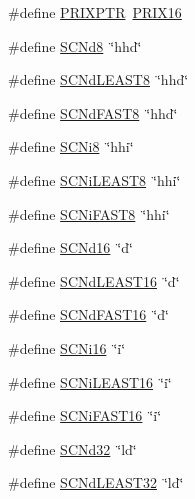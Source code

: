 \begin{DoxyCompactItemize}
\item 
\#define \hyperlink{group__avr__inttypes_ga65d9856517198cfc21558c0d6df64207}{P\+R\+I\+X\+P\+TR}~\hyperlink{group__avr__inttypes_ga570ca9af5087023f75fc8a1a602d26ab}{P\+R\+I\+X16}
\item 
\#define \hyperlink{group__avr__inttypes_gabf98c3a9ad120b11ec2911b9398e3f2f}{S\+C\+Nd8}~\char`\"{}hhd\char`\"{}
\item 
\#define \hyperlink{group__avr__inttypes_gab0af8c396d9c885950d423f8dee54164}{S\+C\+Nd\+L\+E\+A\+S\+T8}~\char`\"{}hhd\char`\"{}
\item 
\#define \hyperlink{group__avr__inttypes_ga6dc7d2f030d25e79ae8398088161b860}{S\+C\+Nd\+F\+A\+S\+T8}~\char`\"{}hhd\char`\"{}
\item 
\#define \hyperlink{group__avr__inttypes_ga535485ea35661ff75a8d2bc0d2ebe807}{S\+C\+Ni8}~\char`\"{}hhi\char`\"{}
\item 
\#define \hyperlink{group__avr__inttypes_ga1a0b88bf6f131db927f2e7f1f6abb644}{S\+C\+Ni\+L\+E\+A\+S\+T8}~\char`\"{}hhi\char`\"{}
\item 
\#define \hyperlink{group__avr__inttypes_gac864120101e01707ca52c0976b4e539a}{S\+C\+Ni\+F\+A\+S\+T8}~\char`\"{}hhi\char`\"{}
\item 
\#define \hyperlink{group__avr__inttypes_ga35974d44b5dcebcb222b8e2c1384241d}{S\+C\+Nd16}~\char`\"{}d\char`\"{}
\item 
\#define \hyperlink{group__avr__inttypes_ga10db5de9c84ccfa6dc0e487dd72051f3}{S\+C\+Nd\+L\+E\+A\+S\+T16}~\char`\"{}d\char`\"{}
\item 
\#define \hyperlink{group__avr__inttypes_ga09c9f36f654aa50a548d7820421cdc57}{S\+C\+Nd\+F\+A\+S\+T16}~\char`\"{}d\char`\"{}
\item 
\#define \hyperlink{group__avr__inttypes_ga7b8508989273ad152f9b3b7cd4db6eee}{S\+C\+Ni16}~\char`\"{}i\char`\"{}
\item 
\#define \hyperlink{group__avr__inttypes_ga14ec2649667b53ff91a1103c02975837}{S\+C\+Ni\+L\+E\+A\+S\+T16}~\char`\"{}i\char`\"{}
\item 
\#define \hyperlink{group__avr__inttypes_gaad333b5bea32321b312a3b4967ff357f}{S\+C\+Ni\+F\+A\+S\+T16}~\char`\"{}i\char`\"{}
\item 
\#define \hyperlink{group__avr__inttypes_ga2b7ab77ff6ede9c3c285b714496f77e2}{S\+C\+Nd32}~\char`\"{}ld\char`\"{}
\item 
\#define \hyperlink{group__avr__inttypes_gae36c293972a5b770349d74f2c0cfa52f}{S\+C\+Nd\+L\+E\+A\+S\+T32}~\char`\"{}ld\char`\"{}
\item 

\end{DoxyCompactItemize}
